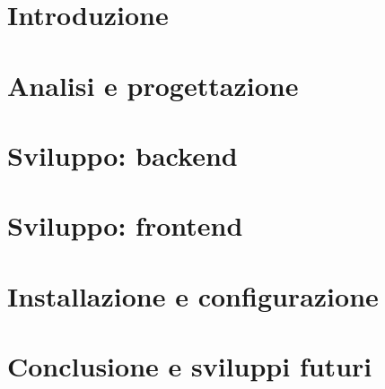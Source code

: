 \documentclass{report}
\begin{document}
    
    \tableofcontents
    \listoffigures
    \chapter{Introduzione}
    
    \chapter{Analisi e progettazione}
    \chapter{Sviluppo: backend}
    \chapter{Sviluppo: frontend}
    \chapter{Installazione e configurazione}
    \chapter{Conclusione e sviluppi futuri}
\end{document}
